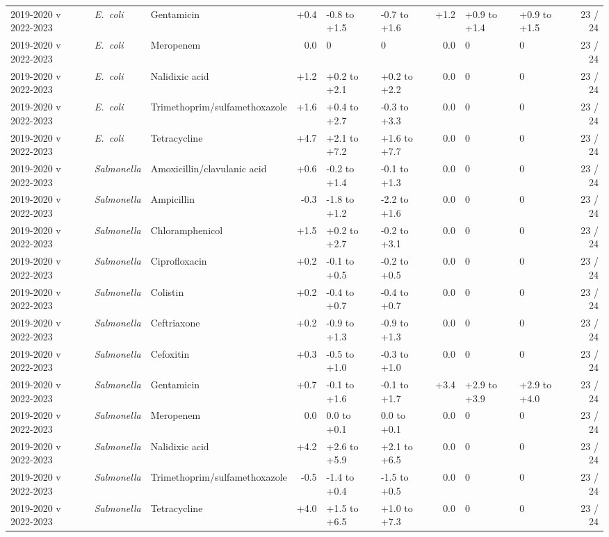 {\begin{longtable}{lllrllrllr}
2019-2020 v 2022-2023 & \textit{E.~coli} & Gentamicin & +0.4 & -0.8 to +1.5 & -0.7 to +1.6 & +1.2 & +0.9 to +1.4 & +0.9 to +1.5 & 23 / 24 \\
2019-2020 v 2022-2023 & \textit{E.~coli} & Meropenem & 0.0 & 0 & 0 & 0.0 & 0 & 0 & 23 / 24 \\
2019-2020 v 2022-2023 & \textit{E.~coli} & Nalidixic acid & +1.2 & +0.2 to +2.1 & +0.2 to +2.2 & 0.0 & 0 & 0 & 23 / 24 \\
2019-2020 v 2022-2023 & \textit{E.~coli} & Trimethoprim/sulfamethoxazole & +1.6 & +0.4 to +2.7 & -0.3 to +3.3 & 0.0 & 0 & 0 & 23 / 24 \\
2019-2020 v 2022-2023 & \textit{E.~coli} & Tetracycline & +4.7 & +2.1 to +7.2 & +1.6 to +7.7 & 0.0 & 0 & 0 & 23 / 24 \\
2019-2020 v 2022-2023 & \textit{Salmonella} & Amoxicillin/clavulanic acid & +0.6 & -0.2 to +1.4 & -0.1 to +1.3 & 0.0 & 0 & 0 & 23 / 24 \\
2019-2020 v 2022-2023 & \textit{Salmonella} & Ampicillin & -0.3 & -1.8 to +1.2 & -2.2 to +1.6 & 0.0 & 0 & 0 & 23 / 24 \\
2019-2020 v 2022-2023 & \textit{Salmonella} & Chloramphenicol & +1.5 & +0.2 to +2.7 & -0.2 to +3.1 & 0.0 & 0 & 0 & 23 / 24 \\
2019-2020 v 2022-2023 & \textit{Salmonella} & Ciprofloxacin & +0.2 & -0.1 to +0.5 & -0.2 to +0.5 & 0.0 & 0 & 0 & 23 / 24 \\
2019-2020 v 2022-2023 & \textit{Salmonella} & Colistin & +0.2 & -0.4 to +0.7 & -0.4 to +0.7 & 0.0 & 0 & 0 & 23 / 24 \\
2019-2020 v 2022-2023 & \textit{Salmonella} & Ceftriaxone & +0.2 & -0.9 to +1.3 & -0.9 to +1.3 & 0.0 & 0 & 0 & 23 / 24 \\
2019-2020 v 2022-2023 & \textit{Salmonella} & Cefoxitin & +0.3 & -0.5 to +1.0 & -0.3 to +1.0 & 0.0 & 0 & 0 & 23 / 24 \\
2019-2020 v 2022-2023 & \textit{Salmonella} & Gentamicin & +0.7 & -0.1 to +1.6 & -0.1 to +1.7 & +3.4 & +2.9 to +3.9 & +2.9 to +4.0 & 23 / 24 \\
2019-2020 v 2022-2023 & \textit{Salmonella} & Meropenem & 0.0 & 0.0 to +0.1 & 0.0 to +0.1 & 0.0 & 0 & 0 & 23 / 24 \\
2019-2020 v 2022-2023 & \textit{Salmonella} & Nalidixic acid & +4.2 & +2.6 to +5.9 & +2.1 to +6.5 & 0.0 & 0 & 0 & 23 / 24 \\
2019-2020 v 2022-2023 & \textit{Salmonella} & Trimethoprim/sulfamethoxazole & -0.5 & -1.4 to +0.4 & -1.5 to +0.5 & 0.0 & 0 & 0 & 23 / 24 \\
2019-2020 v 2022-2023 & \textit{Salmonella} & Tetracycline & +4.0 & +1.5 to +6.5 & +1.0 to +7.3 & 0.0 & 0 & 0 & 23 / 24 \\
\bottomrule
\end{longtable}}

